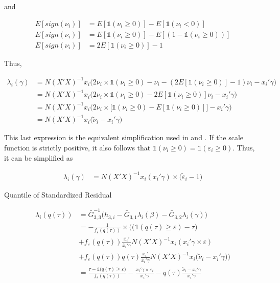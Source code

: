 \documentclass[
  authoryear,
  review,
  1p]{elsarticle}
\begin{document}
and

\[\begin{aligned}
E[sign(\nu_i)] &= E[\mathbb{1}(\nu_i \geq 0)] - E[\mathbb{1}(\nu_i < 0)] \\
E[sign(\nu_i)] &= E[\mathbb{1}(\nu_i \geq 0)] - E[(1-\mathbb{1}(\nu_i \geq 0))] \\
E[sign(\nu_i)] &= 2 E[\mathbb{1}(\nu_i \geq 0)] - 1
\end{aligned}
\]

Thus,

\[\begin{aligned}
\lambda_i(\gamma) &= N(X'X)^{-1} x_i   \Big( 2 \nu_i \times \mathbb{1}(\nu_i \geq 0) - \nu_i  - ( 2 E[\mathbb{1}(\nu_i \geq 0)] - 1) \nu_i -x_i' \gamma \Big) \\
  &= N(X'X)^{-1} x_i   \Big( 2 \nu_i \times \mathbb{1}(\nu_i \geq 0) -  2 E[\mathbb{1}(\nu_i \geq 0)] \nu_i -x_i' \gamma \Big) \\
  &= N(X'X)^{-1} x_i   \Big( 2 \nu_i \times \big[ \mathbb{1}(\nu_i \geq 0) -  E[\mathbb{1}(\nu_i \geq 0)] \big] -x_i'\gamma \Big) \\
  &= N(X'X)^{-1} x_i   \Big( \tilde \nu_i -x_i' 
  \gamma \Big)
\end{aligned}
\]

This last expression is the equivalent simplification used in
\citet{mss2019} and \citet{im2000}. If the scale function is strictly
positive, it also follows that
\(\mathbb{1}(\nu_i \geq 0)= \mathbb{1}(\varepsilon_i \geq 0)\). Thus, it
can be simplified as

\[\begin{aligned}
\lambda_i(\gamma) &= N(X'X)^{-1} x_i ( x_i' \gamma ) \times (\tilde \varepsilon_i -1\big)
\end{aligned}
\]

Quantile of Standardized Residual

\[\begin{aligned}
\lambda_i(q(\tau))&=\bar G_{3,3}^{-1}
\Big(
 h_{3,i}-\bar G_{3,1} \lambda_i(\beta)-\bar G_{3,2} \lambda_i(\gamma)
\Big) \\
&=-\frac{1}{f_{\varepsilon}(q(\tau))} \times \Bigg( \Big(\mathbb{1} ( q(\tau)  \geq \varepsilon  ) - \tau \Big)  \\
&+ f_{\varepsilon} (q(\tau)) \frac{\bar x_i'}{\bar x_i'\gamma} 
N (X'X)^{-1} x_i  ( x_i'\gamma \times \varepsilon) \\
&+ f_{\varepsilon}(q(\tau)) q(\tau) \frac{\bar x_i'}{\bar x_i'\gamma} N(X'X)^{-1} x_i   \big( \tilde \nu_i -x_i' 
  \gamma \big) 
\Bigg) \\
&=\frac{\tau-\mathbb{1}\big( q(\tau)  \geq \varepsilon  \big) }{f_{\varepsilon}(q(\tau))}
- \frac{ x_i'\gamma \times \varepsilon_i }{\bar x_i'\gamma} 
-  q(\tau) \frac{ \tilde \nu_i -x_i' 
  \gamma }{\bar x_i'\gamma} 
\end{aligned}
\]
\end{document}
